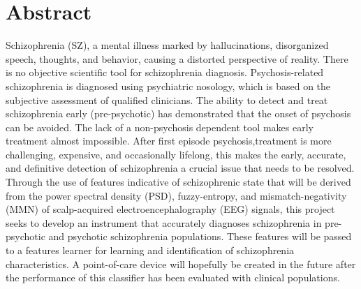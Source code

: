\chapter*{ \textbf{\Large \sc Abstract}}
\vspace{50pt}
Schizophrenia (SZ), a mental illness marked by hallucinations, disorganized speech, thoughts, and behavior, causing a distorted perspective of reality. There is no objective scientific tool for schizophrenia diagnosis. Psychosis-related schizophrenia is diagnosed using psychiatric nosology, which is based on the subjective assessment of qualified clinicians. The ability to detect and treat schizophrenia early (pre-psychotic) has demonstrated that the onset of psychosis can be avoided. The lack of a non-psychosis dependent tool makes early treatment almost impossible. After first episode psychosis,treatment is more challenging, expensive, and occasionally lifelong, this makes the early, accurate, and definitive detection of schizophrenia a crucial issue that needs to be resolved. Through the use of features indicative of schizophrenic state that will be derived from the power spectral density (PSD), fuzzy-entropy, and mismatch-negativity (MMN) of scalp-acquired electroencephalography (EEG) signals, this project seeks to develop an instrument that accurately diagnoses schizophrenia in pre-psychotic and psychotic schizophrenia populations. These features will be passed to a features learner for learning and identification of schizophrenia characteristics. A point-of-care device will hopefully be created in the future after the performance of this classifier has been evaluated with clinical populations.




